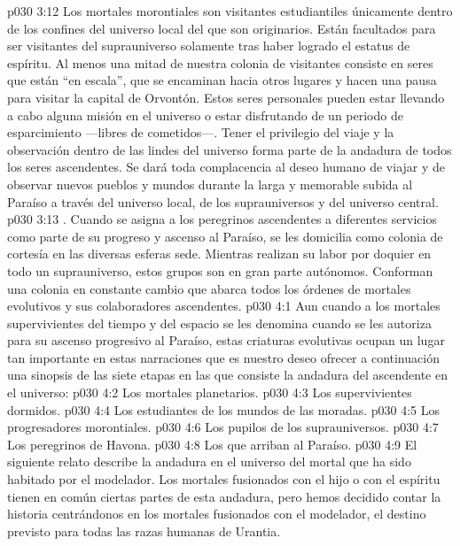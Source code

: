 \vs p030 3:12 Los mortales morontiales son visitantes estudiantiles únicamente dentro de los confines del universo local del que son originarios. Están facultados para ser visitantes del suprauniverso solamente tras haber logrado el estatus de espíritu. Al menos una mitad de nuestra colonia de visitantes consiste en seres que están “en escala”, que se encaminan hacia otros lugares y hacen una pausa para visitar la capital de Orvontón. Estos seres personales pueden estar llevando a cabo alguna misión en el universo o estar disfrutando de un periodo de esparcimiento ---libres de cometidos---. Tener el privilegio del viaje y la observación dentro de las lindes del universo forma parte de la andadura de todos los seres ascendentes. Se dará toda complacencia al deseo humano de viajar y de observar nuevos pueblos y mundos durante la larga y memorable subida al Paraíso a través del universo local, de los suprauniversos y del universo central.
\vs p030 3:13 . Cuando se asigna a los peregrinos ascendentes a diferentes servicios como parte de su progreso y ascenso al Paraíso, se les domicilia como colonia de cortesía en las diversas esferas sede. Mientras realizan su labor por doquier en todo un suprauniverso, estos grupos son en gran parte autónomos. Conforman una colonia en constante cambio que abarca todos los órdenes de mortales evolutivos y sus colaboradores ascendentes.
\vs p030 4:1 Aun cuando a los mortales supervivientes del tiempo y del espacio se les denomina  cuando se les autoriza para su ascenso progresivo al Paraíso, estas criaturas evolutivas ocupan un lugar tan importante en estas narraciones que es nuestro deseo ofrecer a continuación una sinopsis de las siete etapas en las que consiste la andadura del ascendente en el universo:
\vs p030 4:2 Los mortales planetarios.
\vs p030 4:3 Los supervivientes dormidos.
\vs p030 4:4 Los estudiantes de los mundos de las moradas.
\vs p030 4:5 Los progresadores morontiales.
\vs p030 4:6 Los pupilos de los suprauniversos.
\vs p030 4:7 Los peregrinos de Havona.
\vs p030 4:8 Los que arriban al Paraíso.
\vs p030 4:9 \pc El siguiente relato describe la andadura en el universo del mortal que ha sido habitado por el modelador. Los mortales fusionados con el hijo o con el espíritu tienen en común ciertas partes de esta andadura, pero hemos decidido contar la historia centrándonos en los mortales fusionados con el modelador, el destino previsto para todas las razas humanas de Urantia.
